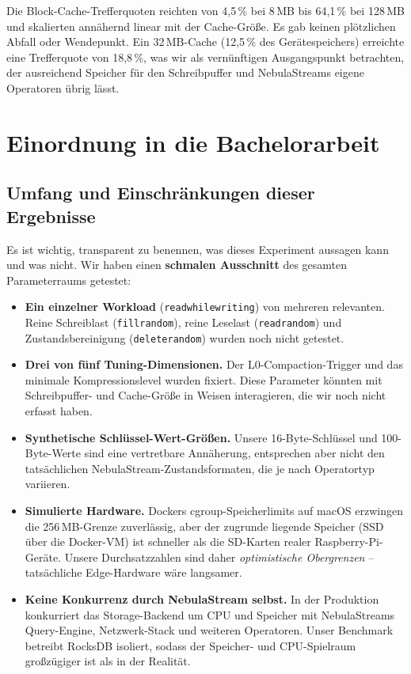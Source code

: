 \documentclass[11pt,a4paper]{scrartcl}
\begin{document}
Die Block-Cache-Trefferquoten reichten von 4,5\,\% bei 8\,MB bis 64,1\,\% bei
128\,MB und skalierten annähernd linear mit der Cache-Größe. Es gab keinen
plötzlichen Abfall oder Wendepunkt. Ein 32\,MB-Cache (12,5\,\% des
Gerätespeichers) erreichte eine Trefferquote von 18,8\,\%, was wir als
vernünftigen Ausgangspunkt betrachten, der ausreichend Speicher für den
Schreibpuffer und NebulaStreams eigene Operatoren übrig lässt.


\section{Einordnung in die Bachelorarbeit}

\subsection{Umfang und Einschränkungen dieser Ergebnisse}

Es ist wichtig, transparent zu benennen, was dieses Experiment aussagen kann
und was nicht. Wir haben einen \textbf{schmalen Ausschnitt} des gesamten
Parameterraums getestet:

\begin{itemize}
  \item \textbf{Ein einzelner Workload} (\texttt{readwhilewriting}) von
        mehreren relevanten. Reine Schreiblast (\texttt{fillrandom}), reine
        Leselast (\texttt{readrandom}) und Zustandsbereinigung
        (\texttt{deleterandom}) wurden noch nicht getestet.
  \item \textbf{Drei von fünf Tuning-Dimensionen.} Der L0-Compaction-Trigger
        und das minimale Kompressionslevel wurden fixiert. Diese Parameter
        könnten mit Schreibpuffer- und Cache-Größe in Weisen interagieren, die
        wir noch nicht erfasst haben.
  \item \textbf{Synthetische Schlüssel-Wert-Größen.} Unsere 16-Byte-Schlüssel
        und 100-Byte-Werte sind eine vertretbare Annäherung, entsprechen aber
        nicht den tatsächlichen NebulaStream-Zustandsformaten, die je nach
        Operatortyp variieren.
  \item \textbf{Simulierte Hardware.} Dockers cgroup-Speicherlimits auf macOS
        erzwingen die 256\,MB-Grenze zuverlässig, aber der zugrunde liegende
        Speicher (SSD über die Docker-VM) ist schneller als die SD-Karten
        realer Raspberry-Pi-Geräte. Unsere Durchsatzzahlen sind daher
        \emph{optimistische Obergrenzen} -- tatsächliche Edge-Hardware wäre
        langsamer.
  \item \textbf{Keine Konkurrenz durch NebulaStream selbst.} In der Produktion
        konkurriert das Storage-Backend um CPU und Speicher mit NebulaStreams
        Query-Engine, Netzwerk-Stack und weiteren Operatoren. Unser Benchmark
        betreibt RocksDB isoliert, sodass der Speicher- und CPU-Spielraum
        großzügiger ist als in der Realität.
\end{itemize}
\end{document}
